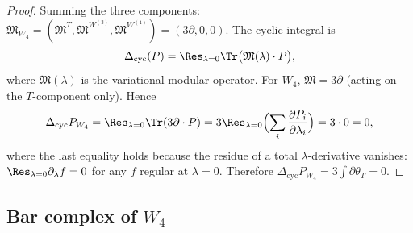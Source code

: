 \begin{proof}
\smallskip
Summing the three components:
$\mathfrak{M}_{W_4} = (\mathfrak{M}^T, \mathfrak{M}^{W^{(3)}},
\mathfrak{M}^{W^{(4)}}) = (3\partial, 0, 0)$.
The cyclic integral is
\[
\Delta_{\mathrm{cyc}}(P)
= \Res_{\lambda=0} \Tr\bigl(\mathfrak{M}(\lambda) \cdot P\bigr),
\]
where $\mathfrak{M}(\lambda)$ is the variational modular operator.
For $W_4$, $\mathfrak{M} = 3\partial$ (acting on the $T$-component
only). Hence
\[
\Delta_{\mathrm{cyc}} P_{W_4}
= \Res_{\lambda=0} \Tr(3\partial \cdot P)
= 3 \Res_{\lambda=0}
 \Bigl(\sum_i \frac{\partial P_i}{\partial\lambda_i}\Bigr)
= 3 \cdot 0 = 0,
\]
where the last equality holds because the residue of a total
$\lambda$-derivative vanishes: $\Res_{\lambda=0}\partial_\lambda f
= 0$ for any $f$ regular at $\lambda = 0$. Therefore
$\Delta_{\mathrm{cyc}} P_{W_4} = 3\int\partial\theta_T = 0$.
\end{proof}

\subsection{Bar complex of $W_4$}

